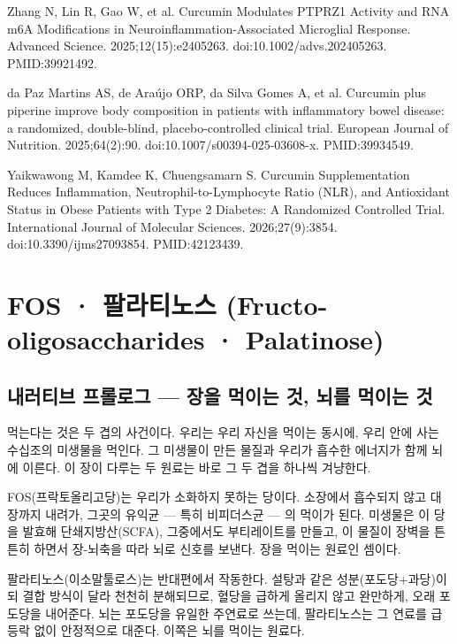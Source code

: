 \documentclass[12pt,oneside]{book}
\newcommand{\refend}{\endgroup\par}
\newcommand{\reff}[2]{\par\hangindent=7mm\hangafter=1\noindent[#1]\hspace{2mm}#2\par}
\begin{document}
\reff{37}{Zhang N, Lin R, Gao W, et al. Curcumin Modulates PTPRZ1 Activity and RNA m6A Modifications in Neuroinflammation-Associated Microglial Response. Advanced Science. 2025;12(15):e2405263. doi:10.1002/advs.202405263. PMID:39921492.}

\reff{38}{da Paz Martins AS, de Araújo ORP, da Silva Gomes A, et al. Curcumin plus piperine improve body composition in patients with inflammatory bowel disease: a randomized, double-blind, placebo-controlled clinical trial. European Journal of Nutrition. 2025;64(2):90. doi:10.1007/s00394-025-03608-x. PMID:39934549.}

\reff{39}{Yaikwawong M, Kamdee K, Chuengsamarn S. Curcumin Supplementation Reduces Inflammation, Neutrophil-to-Lymphocyte Ratio (NLR), and Antioxidant Status in Obese Patients with Type 2 Diabetes: A Randomized Controlled Trial. International Journal of Molecular Sciences. 2026;27(9):3854. doi:10.3390/ijms27093854. PMID:42123439.}

\refend


\chapter{FOS · 팔라티노스 (Fructo-oligosaccharides · Palatinose)}

\section{내러티브 프롤로그 — 장을 먹이는 것, 뇌를 먹이는 것}

먹는다는 것은 두 겹의 사건이다. 우리는 우리 자신을 먹이는 동시에, 우리 안에 사는 수십조의 미생물을 먹인다. 그 미생물이 만든 물질과 우리가 흡수한 에너지가 함께 뇌에 이른다. 이 장이 다루는 두 원료는 바로 그 두 겹을 하나씩 겨냥한다.

FOS(프락토올리고당)는 우리가 소화하지 못하는 당이다. 소장에서 흡수되지 않고 대장까지 내려가, 그곳의 유익균 — 특히 비피더스균 — 의 먹이가 된다. 미생물은 이 당을 발효해 단쇄지방산(SCFA), 그중에서도 부티레이트를 만들고, 이 물질이 장벽을 튼튼히 하면서 장-뇌축을 따라 뇌로 신호를 보낸다. 장을 먹이는 원료인 셈이다.

팔라티노스(이소말툴로스)는 반대편에서 작동한다. 설탕과 같은 성분(포도당+과당)이되 결합 방식이 달라 천천히 분해되므로, 혈당을 급하게 올리지 않고 완만하게, 오래 포도당을 내어준다. 뇌는 포도당을 유일한 주연료로 쓰는데, 팔라티노스는 그 연료를 급등락 없이 안정적으로 대준다. 이쪽은 뇌를 먹이는 원료다.
\end{document}
